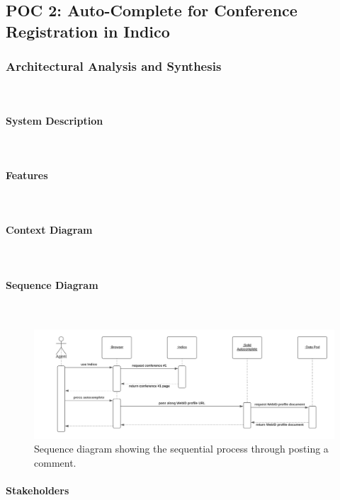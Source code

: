 \subsection{POC 2: Auto-Complete for Conference Registration in Indico}

\subsubsection{Architectural Analysis and Synthesis}\mbox{}\\

\paragraph{System Description}\mbox{}\\
\paragraph{Features}\mbox{}\\
\paragraph{Context Diagram}\mbox{}\\
\paragraph{Sequence Diagram}\mbox{}\\

\begin{figure}[H]
    \centering
    \includegraphics[width=\textwidth]{prototype/graphs/poc-conference_registration-autocomplete-sequence_diagram.png}
    \caption{Sequence diagram showing the sequential process through posting a comment.}
    \label{fig:poc-conference_registration-autocomplete-sequence_diagram}
\end{figure}

\paragraph{Stakeholders}\mbox{}\\
